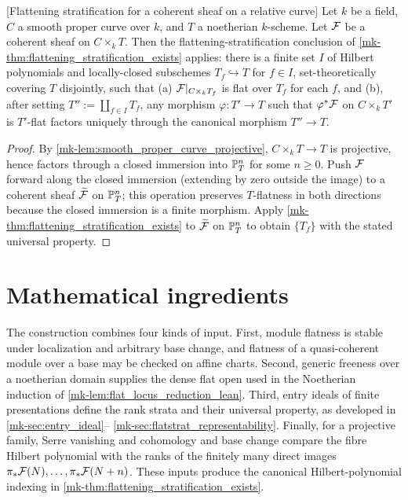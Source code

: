\begin{corollary}

[Flattening stratification for a coherent sheaf on a relative curve]
  \label{mk-cor:flattening_stratification_curve}
  Let \(k\) be a field, \(C\) a smooth proper curve over \(k\), and \(T\) a noetherian
  \(k\)-scheme.  Let \(\mathcal{F}\) be a coherent sheaf on \(C \times_k T\). Then the
  flattening-stratification conclusion of
  \ref{mk-thm:flattening_stratification_exists} applies: there is a finite
  set \(I\) of Hilbert polynomials and locally-closed subschemes
  \(T_f \hookrightarrow T\) for \(f \in I\), set-theoretically covering \(T\)
  disjointly, such that (a) \(\mathcal{F}|_{C \times_k T_f}\) is flat over \(T_f\) for
  each \(f\), and (b), after setting \(T'':=\coprod_{f\in I}T_f\), any
  morphism \(\varphi : T' \to T\) such that \(\varphi^* \mathcal{F}\) on
  \(C \times_k T'\) is \(T'\)-flat factors uniquely through the canonical
  morphism \(T'' \to T\).
\end{corollary}

\begin{proof}
  By \ref{mk-lem:smooth_proper_curve_projective}, \(C \times_k T \to T\) is
  projective, hence factors through a closed immersion into \(\mathbb{P}^n_T\) for some
  \(n \ge 0\).  Push \(\mathcal{F}\) forward along the closed immersion (extending by zero
  outside the image) to a coherent sheaf \(\widetilde{\mathcal{F}}\) on \(\mathbb{P}^n_T\); this
  operation preserves \(T\)-flatness in both directions because the closed
  immersion is a finite morphism.  Apply
  \ref{mk-thm:flattening_stratification_exists} to \(\widetilde{\mathcal{F}}\) on
  \(\mathbb{P}^n_T\) to obtain \(\{T_f\}\) with the stated universal property.
\end{proof}

\section{Mathematical ingredients}
\label{mk-sec:flatstrat_mathlib_status}

The construction combines four kinds of input.  First, module flatness is
stable under localization and arbitrary base change, and flatness of a
quasi-coherent module over a base may be checked on affine charts.  Second,
generic freeness over a noetherian domain supplies the dense flat open used
in the Noetherian induction of \ref{mk-lem:flat_locus_reduction_lean}.  Third,
entry ideals of finite presentations define the rank strata and their
universal property, as developed in \ref{mk-sec:entry_ideal}--
\ref{mk-sec:flatstrat_representability}.  Finally, for a projective family,
Serre vanishing and cohomology and base change compare the fibre Hilbert
polynomial with the ranks of the finitely many direct images
\(\pi_*\mathcal{F}(N),\ldots,\pi_*\mathcal{F}(N+n)\).  These inputs produce the canonical
Hilbert-polynomial indexing in
\ref{mk-thm:flattening_stratification_exists}.

